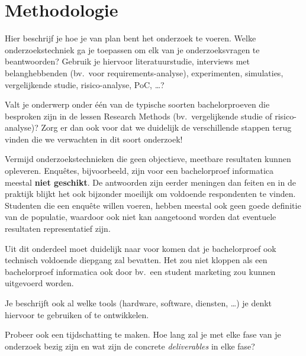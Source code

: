 


\section{Methodologie}%
\label{sec:methodologie}

Hier beschrijf je hoe je van plan bent het onderzoek te voeren. Welke onderzoekstechniek ga je toepassen om elk van je onderzoeksvragen te beantwoorden? Gebruik je hiervoor literatuurstudie, interviews met belanghebbenden (bv.~voor requirements-analyse), experimenten, simulaties, vergelijkende studie, risico-analyse, PoC, \ldots?

Valt je onderwerp onder één van de typische soorten bachelorproeven die besproken zijn in de lessen Research Methods (bv.\ vergelijkende studie of risico-analyse)? Zorg er dan ook voor dat we duidelijk de verschillende stappen terug vinden die we verwachten in dit soort onderzoek!

Vermijd onderzoekstechnieken die geen objectieve, meetbare resultaten kunnen opleveren. Enquêtes, bijvoorbeeld, zijn voor een bachelorproef informatica meestal \textbf{niet geschikt}. De antwoorden zijn eerder meningen dan feiten en in de praktijk blijkt het ook bijzonder moeilijk om voldoende respondenten te vinden. Studenten die een enquête willen voeren, hebben meestal ook geen goede definitie van de populatie, waardoor ook niet kan aangetoond worden dat eventuele resultaten representatief zijn.

Uit dit onderdeel moet duidelijk naar voor komen dat je bachelorproef ook technisch voldoen\-de diepgang zal bevatten. Het zou niet kloppen als een bachelorproef informatica ook door bv.\ een student marketing zou kunnen uitgevoerd worden.

Je beschrijft ook al welke tools (hardware, software, diensten, \ldots) je denkt hiervoor te gebruiken of te ontwikkelen.

Probeer ook een tijdschatting te maken. Hoe lang zal je met elke fase van je onderzoek bezig zijn en wat zijn de concrete \emph{deliverables} in elke fase?

